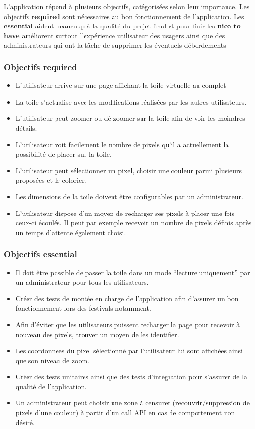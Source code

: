 L'application répond à plusieurs objectifs, catégorisées selon leur importance. Les objectifs \textbf{required} sont nécessaires au bon fonctionnement de l'application. Les \textbf{essential} aident beaucoup à la qualité du projet final et pour finir les \textbf{nice-to-have} améliorent surtout l'expérience utilisateur des usagers ainsi que des administrateurs qui ont la tâche de supprimer les éventuels débordements.

\subsubsection{Objectifs \guillemotleft required\guillemotright}

\begin{itemize}
  \item L'utilisateur arrive sur une page affichant la toile virtuelle au complet.
  \item La toile s'actualise avec les modifications réalisées par les autres utilisateurs.
  \item L'utilisateur peut zoomer ou dé-zoomer sur la toile afin de voir les moindres détails.
  \item L'utilisateur voit facilement le nombre de pixels qu'il a actuellement la possibilité de placer sur la toile.
  \item L'utilisateur peut sélectionner un pixel, choisir une couleur parmi plusieurs proposées et le colorier.
  \item Les dimensions de la toile doivent être configurables par un administrateur.
  \item L'utilisateur dispose d'un moyen de recharger ses pixels à placer une fois ceux-ci écoulés. Il peut par exemple recevoir un nombre de pixels définis après un temps d'attente également choisi.
\end{itemize}

\subsubsection{Objectifs \guillemotleft essential\guillemotright}

\begin{itemize}
  \item Il doit être possible de passer la toile dans un mode “lecture uniquement” par un administrateur pour tous les utilisateurs.
  \item Créer des tests de montée en charge de l'application afin d'assurer un bon fonctionnement lors des festivals notamment.
  \item Afin d'éviter que les utilisateurs puissent recharger la page pour recevoir à nouveau des pixels, trouver un moyen de les identifier.
  \item Les coordonnées du pixel sélectionné par l'utilisateur lui sont affichées ainsi que son niveau de zoom.
  \item Créer des tests unitaires ainsi que des tests d'intégration pour s'assurer de la qualité de l'application.
  \item Un administrateur peut choisir une zone à censurer (recouvrir/suppression de pixels d'une couleur) à partir d'un call API en cas de comportement non désiré.
\end{itemize}

